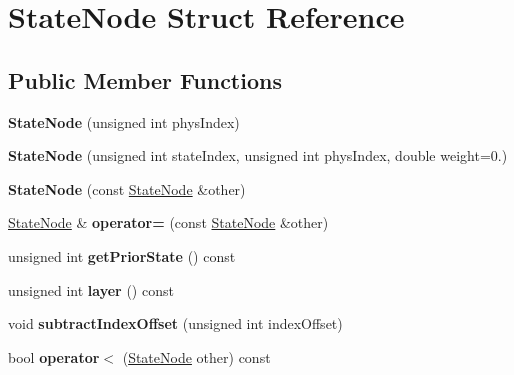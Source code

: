 \hypertarget{structStateNode}{}\section{State\+Node Struct Reference}
\label{structStateNode}
\subsection*{Public Member Functions}
\begin{DoxyCompactItemize}
\item 
\mbox{\label{structStateNode_acdbed29f2d75f93beddecf1b5523734e}} 
{\bfseries State\+Node} (unsigned int phys\+Index)
\item 
\mbox{\label{structStateNode_a7cda495976c32b41fce96c7b6ec516e5}} 
{\bfseries State\+Node} (unsigned int state\+Index, unsigned int phys\+Index, double weight=0.)
\item 
\mbox{\label{structStateNode_a1659c611d5c0790bb02fc6d277b6355e}} 
{\bfseries State\+Node} (const \mbox{\hyperlink{structStateNode}{State\+Node}} \&other)
\item 
\mbox{\label{structStateNode_a49820d3eb286db2477fd5e5e88e0ba88}} 
\mbox{\hyperlink{structStateNode}{State\+Node}} \& {\bfseries operator=} (const \mbox{\hyperlink{structStateNode}{State\+Node}} \&other)
\item 
\mbox{\label{structStateNode_a251f3898f11164e6a334a4382afe6ea8}} 
unsigned int {\bfseries get\+Prior\+State} () const
\item 
\mbox{\label{structStateNode_abc532ef830a2628ea684a0c93d8d2913}} 
unsigned int {\bfseries layer} () const
\item 
\mbox{\label{structStateNode_afbddf2693f54283175d78049eb06eca8}} 
void {\bfseries subtract\+Index\+Offset} (unsigned int index\+Offset)
\item 
\mbox{\label{structStateNode_a73a92f6161e41a589cc722186f3fa955}} 
bool {\bfseries operator$<$} (\mbox{\hyperlink{structStateNode}{State\+Node}} other) const
\item 

\end{DoxyCompactItemize}
